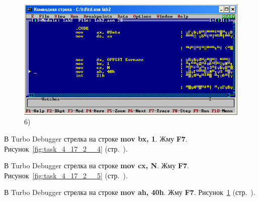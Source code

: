 \begin{figure}[!htp]
\begin {minipage}{0.32\textwidth}
        \centering
        \includegraphics[width=.99\linewidth]
            {../_INCLUDES/task-4-17-2/6.png}
        \caption{6) }
        \label{fig:task_4_17_2__6}
    \end{minipage}
\end{figure}

В Turbo Debugger стрелка на строке \textbf{mov bx, 1}.
Жму \textbf{F7}.
Рисунок~\ref{fig:task_4_17_2__4} (стр.~\pageref{fig:task_4_17_2__4}).

В Turbo Debugger стрелка на строке \textbf{mov cx, N}.
Жму \textbf{F7}.
Рисунок~\ref{fig:task_4_17_2__5} (стр.~\pageref{fig:task_4_17_2__5}).

В Turbo Debugger стрелка на строке \textbf{mov ah, 40h}.
Жму \textbf{F7}.
Рисунок~\ref{fig:task_4_17_2__6} (стр.~\pageref{fig:task_4_17_2__6}).

